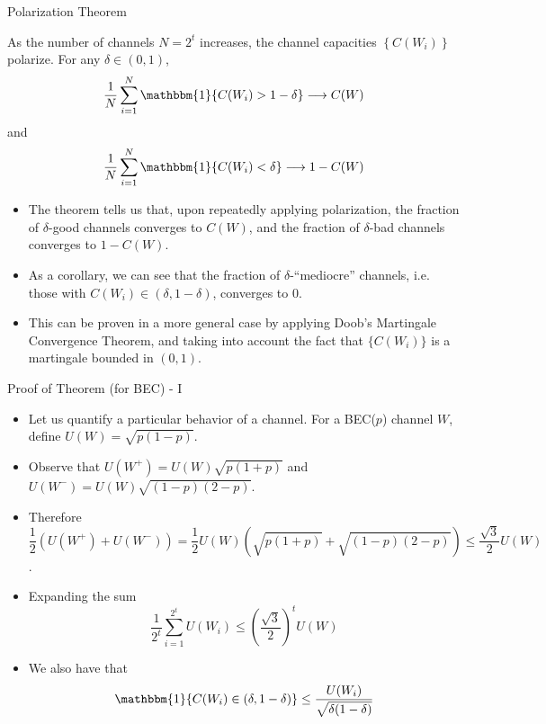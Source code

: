 \documentclass[8pt, compress]{beamer}
\begin{document}
\begin{frame}{Polarization Theorem}

\begin{theorem}
    As the number of channels $N = 2^t$ increases, the channel capacities $\left\{C(W_i)\right\}$ polarize. For any $\delta \in (0,1)$, 
    $$
    \frac{1}{N}\sum_{i=1}^{N} \mathbbm{1}\{C(W_i) > 1 - \delta\} \longrightarrow C(W)
    $$
    and
    $$
    \frac{1}{N}\sum_{i=1}^{N} \mathbbm{1}\{C(W_i) <  \delta\} \longrightarrow 1 - C(W)
    $$
\end{theorem}

\begin{itemize}
    \item<2-> The theorem tells us that, upon repeatedly applying polarization, the fraction of $\delta$-good channels converges to $C(W)$, and the fraction of $\delta$-bad channels converges to $1-C(W)$.
    \item<3-> As a corollary, we can see that the fraction of $\delta$-``mediocre'' channels, i.e. those with $C(W_i) \in (\delta, 1-\delta)$, converges to 0.
    \item<4-> This can be proven in a more general case by applying Doob's Martingale Convergence Theorem, and taking into account the fact that $\{ C(W_i) \}$ is a martingale bounded in $(0,1)$.
\end{itemize}
    
\end{frame}

\begin{frame}{Proof of Theorem (for BEC) - I}
    \begin{itemize}
        \item<1-> Let us quantify a particular behavior of a channel. For a BEC($p$) channel $W$, define $U(W) = \sqrt{p(1-p)}$.
        \item<2-> Observe that $U(W^+) = U(W)\sqrt{p(1+p)}$ and $U(W^-) = U(W)\sqrt{(1-p)(2-p)}$.
        \item<3-> Therefore $$\frac{1}{2}(U(W^+) + U(W^-)) = \frac{1}{2}U(W)(\sqrt{p(1+p)} + \sqrt{(1-p)(2-p)}) \leq \frac{\sqrt{3}}{2}U(W)$$.
        \item<4-> Expanding the sum
        $$
        \frac{1}{2^t}\sum_{i = 1}^{2^t}{U(W_i)} \leq \left(\frac{\sqrt{3}}{2}\right)^{t} U(W)
        $$
        \item<5-> We also have that 
        $$\mathbbm{1}\{C(W_i) \in (\delta, 1-\delta)\} \leq \frac{U(W_i)}{\sqrt{\delta(1-\delta)}}$$ 
    \end{itemize}
\end{frame}
\end{document}
